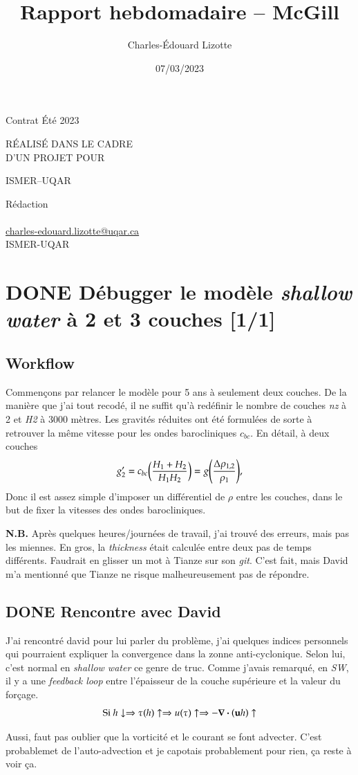 \documentclass[10pt]{article}
\author{Charles-Édouard Lizotte}
\date{07/03/2023}
\title{Rapport hebdomadaire -- McGill}
\makeatletter
\numberwithin{equation}{section}
\newcommand{\mytitlepage}{
\begin{titlepage}
\begin{center}
{\Large Contrat Été 2023 \par}
\vspace{2cm}
{\Large \MakeUppercase{\thetitle} \par}
\vspace{2cm}
RÉALISÉ DANS LE CADRE\\ D'UN PROJET POUR \par
\vspace{2cm}
{\Large ISMER--UQAR \par}
\vspace{2cm}
{\thedate}
\end{center}
\vfill
Rédaction \\
{\theauthor}\\
\url{charles-edouard.lizotte@uqar.ca}\\
ISMER-UQAR
\end{titlepage}
}
\makeatother
\begin{document}
\mytitlepage
\tableofcontents\newpage


\section{{\bfseries\sffamily DONE} Débugger le modèle \emph{shallow water} à 2 et 3 couches [1/1]}
\label{sec:org87a8305}
\subsection{Workflow}
\label{sec:orga160628}
Commençons par relancer le modèle pour 5 ans à seulement deux couches.
De la manière que j'ai tout recodé, il ne suffit qu'à redéfinir le nombre de couches \emph{nz} à 2 et \emph{H2} à 3000 mètres.
Les gravités réduites ont été formulées de sorte à retrouver la même vitesse pour les ondes barocliniques \(c_{bc}\).
En détail, à deux couches
\begin{equation}
g_2' = c_{bc} \qty(\frac{H_1+H_2}{H_1H_2}) = g \qty(\frac{\Delta \rho_{1,2}}{\rho_1}),
\end{equation}
Donc il est assez simple d'imposer un différentiel de \(\rho\) entre les couches, dans le but de fixer la vitesses des ondes barocliniques.

\textbf{N.B.} Après quelques heures/journées de travail, j'ai trouvé des erreurs, mais pas les miennes.
En gros, la \emph{thickness} était calculée entre deux pas de temps différents.
Faudrait en glisser un mot à Tianze sur son \emph{git}.
C'est fait, mais David m'a mentionné que Tianze ne risque malheureusement pas de répondre.

\subsection{{\bfseries\sffamily DONE} Rencontre avec David}
\label{sec:orge0e115c}
J'ai rencontré david pour lui parler du problème, j'ai quelques indices personnels qui pourraient expliquer la convergence dans la zonne anti-cyclonique. 
Selon lui, c'est normal en \emph{shallow water} ce genre de truc.
Comme j'avais remarqué, en \emph{SW}, il y a une \emph{feedback loop} entre l'épaisseur de la couche supérieure et la valeur du forçage.
\begin{equation}
\text{Si } h \downarrow
\Rightarrow \tau (h) \uparrow
\Rightarrow u(\tau) \uparrow
\Rightarrow -\divergence(\vb{u}h) \uparrow
\end{equation}

Aussi, faut pas oublier que la vorticité et le courant se font advecter.
C'est probablemet de l'auto-advection et je capotais probablement pour rien, ça reste à voir ça.\\[0pt]
\end{document}
